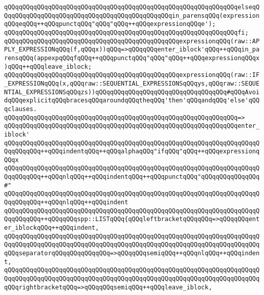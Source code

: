 \verb|qQQqqQQqqQQqqQQqqQQqqQQqqQQqqQQqqQQqqQQqqQQqqQQqqQQqqQQqqQQqqQQqelseqQQqqQQqqQQqqQQqqQQqqQQqqQQqqQQqqQQqqQQqqQQqqQQqin_parensqQQq(expressionqQQqeqQQq++qQQqpunctqQQq"qQQq"qQQq++qQQqexpressionqQQqe');|\newline
\verb|qQQqqQQqqQQqqQQqqQQqqQQqqQQqqQQqqQQqqQQqqQQqqQQqqQQqqQQqqQQqqQQqfi;|\newline
\newline
\verb|qQQqqQQqqQQqqQQqqQQqqQQqqQQqqQQqqQQqqQQqqQQqqQQqexpressionqQQq(raw::APPLY_EXPRESSIONqQQq(f,qQQqx))qQQq=>qQQqqQQqenter_iblock'qQQq++qQQqin_parensqQQq(appexpqQQqfqQQq++qQQqpunctqQQq"qQQq"qQQq++qQQqexpressionqQQqx)qQQq++qQQqleave_iblock;|\newline
\newline
\verb|qQQqqQQqqQQqqQQqqQQqqQQqqQQqqQQqqQQqqQQqqQQqqQQqexpressionqQQq(raw::IF_EXPRESSIONqQQq(x,qQQqraw::SEQUENTIAL_EXPRESSIONSqQQqys,qQQqraw::SEQUENTIAL_EXPRESSIONSqQQqzs))qQQqqQQqqQQqqQQqqQQqqQQqqQQqqQQqqQQq#qQQqAvoidqQQqexplicitqQQqbracesqQQqaroundqQQqtheqQQq'then'qQQqandqQQq'else'qQQqclauses.|\newline
\verb|qQQqqQQqqQQqqQQqqQQqqQQqqQQqqQQqqQQqqQQqqQQqqQQqqQQqqQQqqQQqqQQq=>|\newline
\verb|qQQqqQQqqQQqqQQqqQQqqQQqqQQqqQQqqQQqqQQqqQQqqQQqqQQqqQQqqQQqqQQqenter_iblock'|\newline
\verb|qQQqqQQqqQQqqQQqqQQqqQQqqQQqqQQqqQQqqQQqqQQqqQQqqQQqqQQqqQQqqQQqqQQqqQQqqQQqqQQq++qQQqindentqQQq++qQQqalphaqQQq"ifqQQq"qQQq++qQQqexpressionqQQqx|\newline
\verb|qQQqqQQqqQQqqQQqqQQqqQQqqQQqqQQqqQQqqQQqqQQqqQQqqQQqqQQqqQQqqQQqqQQqqQQqqQQqqQQq++qQQqnlqQQq++qQQqindentqQQq++qQQqpunctqQQq"qQQqqQQqqQQqqQQq#"|\newline
\verb|qQQqqQQqqQQqqQQqqQQqqQQqqQQqqQQqqQQqqQQqqQQqqQQqqQQqqQQqqQQqqQQqqQQqqQQqqQQqqQQq++qQQqnlqQQq++qQQqindent|\newline
\verb|qQQqqQQqqQQqqQQqqQQqqQQqqQQqqQQqqQQqqQQqqQQqqQQqqQQqqQQqqQQqqQQqqQQqqQQqqQQqqQQq++qQQqqQQqspp::LISTqQQq{qQQqleftbracketqQQqqQQq=>qQQqqQQqenter_iblockqQQq++qQQqindent,|\newline
\verb|qQQqqQQqqQQqqQQqqQQqqQQqqQQqqQQqqQQqqQQqqQQqqQQqqQQqqQQqqQQqqQQqqQQqqQQqqQQqqQQqqQQqqQQqqQQqqQQqqQQqqQQqqQQqqQQqqQQqqQQqqQQqqQQqqQQqqQQqqQQqqQQqseparatorqQQqqQQqqQQqqQQq=>qQQqqQQqsemiqQQq++qQQqnlqQQq++qQQqindent,|\newline
\verb|qQQqqQQqqQQqqQQqqQQqqQQqqQQqqQQqqQQqqQQqqQQqqQQqqQQqqQQqqQQqqQQqqQQqqQQqqQQqqQQqqQQqqQQqqQQqqQQqqQQqqQQqqQQqqQQqqQQqqQQqqQQqqQQqqQQqqQQqqQQqqQQqrightbracketqQQq=>qQQqqQQqsemiqQQq++qQQqleave_iblock,|\newline
